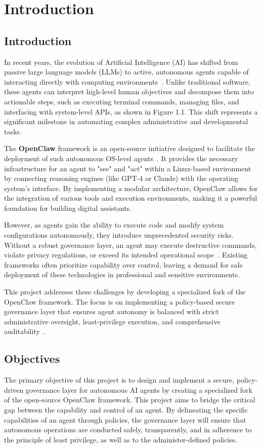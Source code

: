 \documentclass[a4paper]{report}
\begin{document}
\chapter{Introduction}




\section{Introduction}
In recent years, the evolution of Artificial Intelligence (AI) has shifted from passive large language models (LLMs) to active, autonomous agents capable of interacting directly with computing environments~\cite{chen2025survey, mei2025aios}. Unlike traditional software, these agents can interpret high-level human objectives and decompose them into actionable steps, such as executing terminal commands, managing files, and interfacing with system-level APIs, as shown in Figure 1.1. This shift represents a significant milestone in automating complex administrative and developmental tasks.


The \textbf{OpenClaw} framework is an open-source initiative designed to facilitate the deployment of such autonomous OS-level agents~\cite{anonymous2026systematic}. It provides the necessary infrastructure for an agent to "see" and "act" within a Linux-based environment by connecting reasoning engines (like GPT-4 or Claude) with the   operating system’s interface. By implementing a modular architecture, OpenClaw allows for the integration of various tools and execution environments, making it a powerful foundation for building digital assistants.

However, as agents gain the ability to execute code and modify system configurations autonomously, they introduce unprecedented security risks. Without a robust governance layer, an agent may execute destructive commands, violate privacy regulations, or exceed its intended operational scope~\cite{jones2025systematization}. Existing frameworks often prioritize capability over control, leaving a demand for safe deployment of these technologies in professional and sensitive environments.

This project addresses these challenges by developing a specialized fork of the OpenClaw framework. The focus is on implementing a policy-based secure governance layer that ensures agent autonomy is balanced with strict administrative oversight, least-privilege execution, and comprehensive auditability~\cite{anonymous2026governance}.


\section{Objectives}
The primary objective of this project is to design and implement a secure, policy-driven governance layer for autonomous AI agents by creating a specialized fork of the open-source OpenClaw framework. This project aims to bridge the critical gap between the capability and control of an agent. By delineating the specific capabilities of an agent through policies, the governance layer will ensure that autonomous operations are conducted safely, transparently, and in adherence to the principle of least privilege, as well as to the administer-defined policies.
\end{document}
